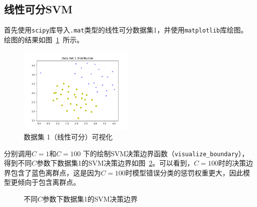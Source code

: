 \documentclass{SEU-AI-Report}
\begin{document}
\subsection{线性可分SVM}




首先使用\texttt{scipy}库导入\texttt{.mat}类型的线性可分数据集1，并使用\texttt{matplotlib}库绘图。绘图的结果如图~\ref{fig:dataset1}~所示。

\begin{figure}[htbp]
    \centering
    \includegraphics[width=0.5\textwidth]{figure/fig1.png}
    \caption{数据集 1（线性可分）可视化}
    \label{fig:dataset1}
\end{figure}

分别调用$C = 1$和$C = 100$ 下的绘制SVM决策边界函数（\texttt{visualize\_boundary}），得到不同$C$参数下数据集1的SVM决策边界如图~\ref{fig:result1}。可以看到，$C=100$时的决策边界包含了蓝色离群点，这是因为$C=100$时模型错误分类的惩罚权重更大，因此模型更倾向于包含离群点。
\begin{figure}[htbp]
    \centering
    \hfill
    \caption{不同$C$参数下数据集1的SVM决策边界}
    \label{fig:result1}
\end{figure}
\end{document}

